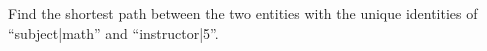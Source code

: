 		\begin{ex}
			Find the shortest path between the two entities with the unique identities of ``subject|math'' and ``instructor|5''.
			
		\end{ex}
		
		
		
		
		
		
		
		
		
		
		
		
		
		